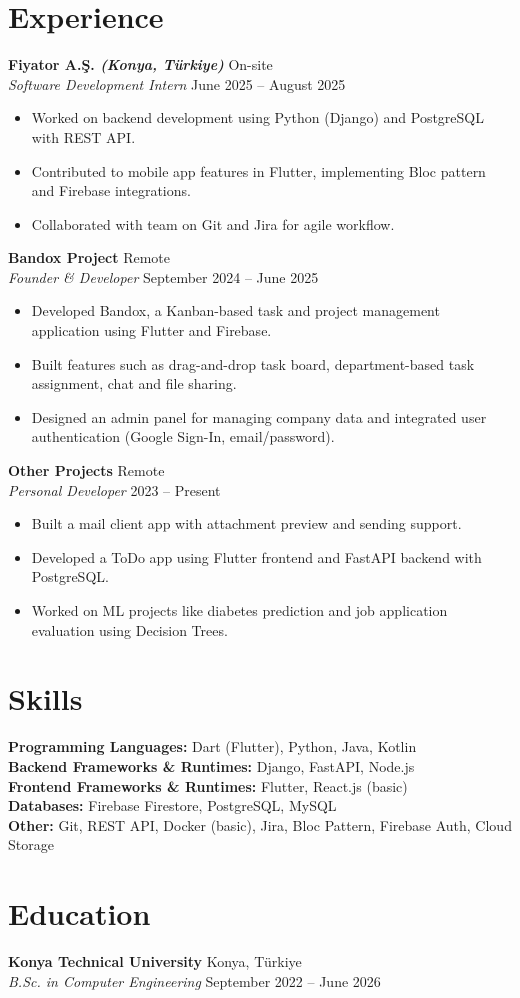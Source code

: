 \documentclass[10pt,a4paper]{extarticle}
\begin{document}
\section{Experience}
\textbf{Fiyator A.Ş. \textit{(Konya, Türkiye)}} \hfill On-site\\
\textit{Software Development Intern} \hfill June 2025 -- August 2025
\begin{itemize}[leftmargin=*,noitemsep,topsep=0pt]
    \item Worked on backend development using Python (Django) and PostgreSQL with REST API.
    \item Contributed to mobile app features in Flutter, implementing Bloc pattern and Firebase integrations.
    \item Collaborated with team on Git and Jira for agile workflow.
\end{itemize}
\textbf{Bandox Project} \hfill Remote\\
\textit{Founder \& Developer} \hfill September 2024 -- June 2025
\begin{itemize}[leftmargin=*,noitemsep,topsep=0pt]
    \item Developed Bandox, a Kanban-based task and project management application using Flutter and Firebase.
    \item Built features such as drag-and-drop task board, department-based task assignment, chat and file sharing.
    \item Designed an admin panel for managing company data and integrated user authentication (Google Sign-In, email/password).
\end{itemize}
\textbf{Other Projects} \hfill Remote\\
\textit{Personal Developer} \hfill 2023 -- Present
\begin{itemize}[leftmargin=*,noitemsep,topsep=0pt]
    \item Built a mail client app with attachment preview and sending support.
    \item Developed a ToDo app using Flutter frontend and FastAPI backend with PostgreSQL.
    \item Worked on ML projects like diabetes prediction and job application evaluation using Decision Trees.
\end{itemize}
\section{Skills}
\textbf{Programming Languages:} Dart (Flutter), Python, Java, Kotlin\\
\textbf{Backend Frameworks \& Runtimes:} Django, FastAPI, Node.js\\
\textbf{Frontend Frameworks \& Runtimes:} Flutter, React.js (basic)\\
\textbf{Databases:} Firebase Firestore, PostgreSQL, MySQL\\
\textbf{Other:} Git, REST API, Docker (basic), Jira, Bloc Pattern, Firebase Auth, Cloud Storage
\section{Education}
\textbf{Konya Technical University} \hfill Konya, Türkiye\\
\textit{B.Sc. in Computer Engineering} \hfill September 2022 -- June 2026
\end{document}

